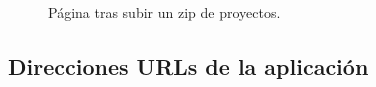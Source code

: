 \documentclass[a4paper, 12pt]{book}
\begin{document}
\begin{figure}[H]
     \centering
     \caption{Página tras subir un zip de proyectos.} \label{fig:pag_subida_zip}
\end{figure}
% 

\newpage
\subsection{Direcciones URLs de la aplicación}
\label{subsec:Tabla de urls con sus vistas}
\end{document}
